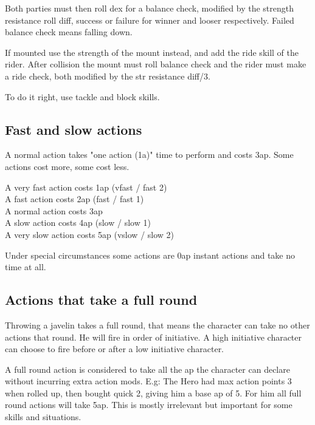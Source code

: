 Both parties must then roll dex for a balance check, modified by the strength resistance roll diff, success or failure for winner and looser respectively. Failed balance check means falling down.

If mounted use the strength of the mount instead, and add the ride skill of the rider. After collision the mount must roll balance check and the rider must make a ride check, both modified by the str resistance diff/3.

To do it right, use tackle and block skills.














\subsection*{Fast and slow actions}
A normal action takes "one action (1a)" time to perform and costs 3ap. Some actions cost more, some cost less.

\noindent
A very fast action costs 1ap (vfast / fast 2) \\
A fast action costs 2ap (fast / fast 1) \\
A normal action costs 3ap \\
A slow action costs 4ap (slow / slow 1) \\
A very slow action costs 5ap (vslow / slow 2)

\noindent
Under special circumstances some actions are 0ap instant actions and take no time at all.


\subsection*{Actions that take a full round}
\label{sec:fullroundactions}
Throwing a javelin takes a full round, that means the character can take no other actions that round. He will fire in order of initiative. A high initiative character can choose to fire before or after a low initiative character.

A full round action is considered to take all the ap the character can declare without incurring extra action mods. E.g: The Hero had max action points 3 when rolled up, then bought quick 2, giving him a base ap of 5. For him all full round actions will take 5ap. This is mostly irrelevant but important for some skills and situations.


